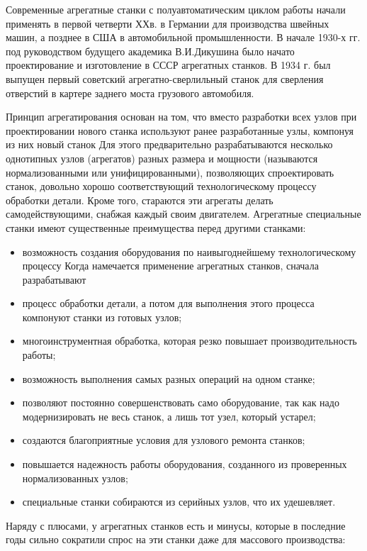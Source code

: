 Современные агрегатные станки с полуавтоматическим циклом работы начали применять в первой четверти ХХ\:в. в Германии для производства швейных машин, а позднее в США в автомобильной промышленности. В начале 1930-х гг. под руководством будущего академика В.\:И.\:Дикушина было начато проектирование и изготовление в СССР агрегатных станков. В 1934 г. был выпущен первый советский агрегатно-сверлильный станок для сверления отверстий в картере заднего моста грузового автомобиля.

Принцип агрегатирования основан на том, что вместо разработки всех узлов при проектировании нового станка используют ранее разработанные узлы, компонуя из них новый станок Для этого предварительно разрабатываются несколько однотипных узлов (агрегатов) разных размера и мощности (называются нормализованными или унифицированными), позволяющих спроектировать станок, довольно хорошо соответствующий технологическому процессу обработки детали. Кроме того, стараются эти агрегаты делать самодействующими, снабжая каждый своим двигателем. Агрегатные специальные станки имеют существенные преимущества перед другими станками:

\begin{itemize}
	\item возможность создания оборудования по наивыгоднейшему технологическому процессу Когда намечается применение агрегатных станков, сначала разрабатывают \item процесс обработки детали, а потом для выполнения этого процесса компонуют станки из готовых узлов;
	\item многоинструментная обработка, которая резко повышает производительность работы;
	\item возможность выполнения самых разных операций на одном станке;
	\item позволяют постоянно совершенствовать само оборудование, так как надо модернизировать не весь станок, а лишь тот узел, который устарел;
	\item создаются благоприятные условия для узлового ремонта станков;
	\item повышается надежность работы оборудования, созданного из проверенных нормализованных узлов;
	\item специальные станки собираются из серийных узлов, что их удешевляет.
\end{itemize}

Наряду с плюсами, у агрегатных станков есть и минусы, которые в последние годы сильно сократили спрос на эти станки даже для массового производства:

